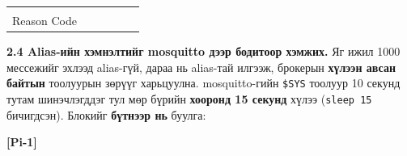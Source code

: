 \begin{longtable}[]{@{}llllll@{}}
\begin{minipage}[t]{0.14\columnwidth}
\strut
\end{minipage} & \begin{minipage}[t]{0.14\columnwidth}\raggedright
\strut
\end{minipage} & \begin{minipage}[t]{0.14\columnwidth}\raggedright
\strut
\end{minipage} & \begin{minipage}[t]{0.14\columnwidth}\raggedright
\strut
\end{minipage}\tabularnewline
\begin{minipage}[t]{0.14\columnwidth}\raggedright
Reason Code\strut
\end{minipage} & \begin{minipage}[t]{0.14\columnwidth}\raggedright
\strut
\end{minipage} & \begin{minipage}[t]{0.14\columnwidth}\raggedright
\strut
\end{minipage} & \begin{minipage}[t]{0.14\columnwidth}\raggedright
\strut
\end{minipage} & \begin{minipage}[t]{0.14\columnwidth}\raggedright
\strut
\end{minipage} & \begin{minipage}[t]{0.14\columnwidth}\raggedright
\strut
\end{minipage}\tabularnewline
\bottomrule
\end{longtable}\endgroup

\textbf{2.4 Alias-ийн хэмнэлтийг mosquitto дээр бодитоор хэмжих.} Яг ижил 1000 мессежийг эхлээд alias-гүй, дараа нь alias-тай илгээж, брокерын \textbf{хүлээн авсан байтын} тоолуурын зөрүүг харьцуулна. mosquitto-гийн \texttt{\$SYS} тоолуур 10 секунд тутам шинэчлэгддэг тул мөр бүрийн \textbf{хооронд 15 секунд} хүлээ (\texttt{sleep\ 15} бичигдсэн). Блокийг \textbf{бүтнээр нь} буулга:

\textbf{{[}Pi-1{]}}


